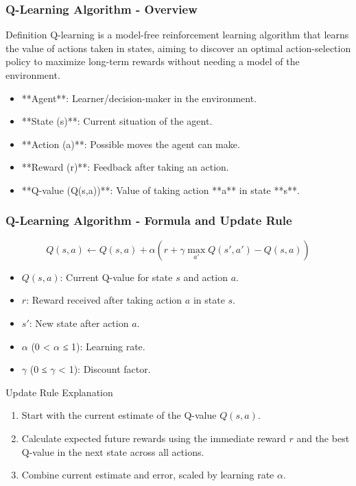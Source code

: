 \documentclass{beamer}
\begin{document}
\begin{frame}[fragile]
    \frametitle{Q-Learning Algorithm - Overview}
    \begin{block}{Definition}
        Q-learning is a model-free reinforcement learning algorithm that learns the value of actions taken in states, aiming to discover an optimal action-selection policy to maximize long-term rewards without needing a model of the environment.
    \end{block}
    
    \begin{itemize}
        \item **Agent**: Learner/decision-maker in the environment.
        \item **State (s)**: Current situation of the agent.
        \item **Action (a)**: Possible moves the agent can make.
        \item **Reward (r)**: Feedback after taking an action.
        \item **Q-value (Q(s,a))**: Value of taking action **a** in state **s**.
    \end{itemize}
\end{frame}

\begin{frame}[fragile]
    \frametitle{Q-Learning Algorithm - Formula and Update Rule}
    \begin{equation}
        Q(s, a) \leftarrow Q(s, a) + \alpha \left( r + \gamma \max_{a'} Q(s', a') - Q(s, a) \right)
    \end{equation}
    
    \begin{itemize}
        \item \( Q(s, a) \): Current Q-value for state \(s\) and action \(a\).
        \item \( r \): Reward received after taking action \(a\) in state \(s\).
        \item \( s' \): New state after action \(a\).
        \item \( \alpha \) (0 < \( \alpha \) ≤ 1): Learning rate.
        \item \( \gamma \) (0 ≤ \( \gamma \) < 1): Discount factor.
    \end{itemize}
    
    \begin{block}{Update Rule Explanation}
        \begin{enumerate}
            \item Start with the current estimate of the Q-value \( Q(s, a) \).
            \item Calculate expected future rewards using the immediate reward \( r \) and the best Q-value in the next state across all actions.
            \item Combine current estimate and error, scaled by learning rate \( \alpha \).
        \end{enumerate}
    \end{block}
\end{frame}
\end{document}
